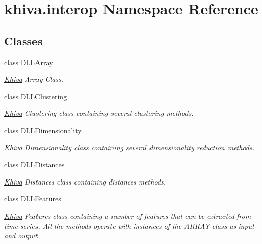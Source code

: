\hypertarget{namespacekhiva_1_1interop}{}\section{khiva.\+interop Namespace Reference}
\label{namespacekhiva_1_1interop}
\subsection*{Classes}
\begin{DoxyCompactItemize}
\item 
class \mbox{\hyperlink{classkhiva_1_1interop_1_1_d_l_l_array}{D\+L\+L\+Array}}
\begin{DoxyCompactList}\small\item\em \mbox{\hyperlink{classkhiva_1_1_khiva}{Khiva}} Array Class. \end{DoxyCompactList}\item 
class \mbox{\hyperlink{classkhiva_1_1interop_1_1_d_l_l_clustering}{D\+L\+L\+Clustering}}
\begin{DoxyCompactList}\small\item\em \mbox{\hyperlink{classkhiva_1_1_khiva}{Khiva}} Clustering class containing several clustering methods. \end{DoxyCompactList}\item 
class \mbox{\hyperlink{classkhiva_1_1interop_1_1_d_l_l_dimensionality}{D\+L\+L\+Dimensionality}}
\begin{DoxyCompactList}\small\item\em \mbox{\hyperlink{classkhiva_1_1_khiva}{Khiva}} Dimensionality class containing several dimensionality reduction methods. \end{DoxyCompactList}\item 
class \mbox{\hyperlink{classkhiva_1_1interop_1_1_d_l_l_distances}{D\+L\+L\+Distances}}
\begin{DoxyCompactList}\small\item\em \mbox{\hyperlink{classkhiva_1_1_khiva}{Khiva}} Distances class containing distances methods. \end{DoxyCompactList}\item 
class \mbox{\hyperlink{classkhiva_1_1interop_1_1_d_l_l_features}{D\+L\+L\+Features}}
\begin{DoxyCompactList}\small\item\em \mbox{\hyperlink{classkhiva_1_1_khiva}{Khiva}} Features class containing a number of features that can be extracted from time series. All the methods operate with instances of the A\+R\+R\+AY class as input and output. \end{DoxyCompactList}\item 

\end{DoxyCompactItemize}
